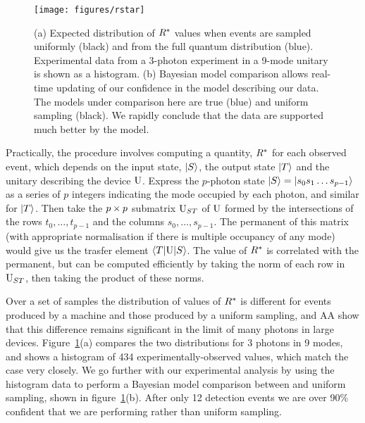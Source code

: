 \begin{figure}[t]
  \centering
  \texttt{[image: figures/rstar]}
  \caption[Using the $\rstar$ discriminator to verify BosonSampling]
  {(a) Expected distribution of \(\rstar\) values when events are sampled
  uniformly (black) and from the full quantum distribution (blue). Experimental
  data from a 3-photon experiment in a 9-mode unitary is shown as a histogram.
  (b) Bayesian model comparison allows real-time updating of our confidence in
  the model describing our data. The models under comparison here are true
  \bosonsampling{} (blue) and uniform sampling (black). We rapidly conclude that
  the data are supported much better by the \bosonsampling{} model.}
  \label{fig:rstar}
\end{figure}
Practically, the procedure involves computing a quantity, \(\rstar\) for each
observed event, which depends on the input state, \(\left|S\right\rangle\), the output state
\(\left|T\right\rangle\) and the unitary describing the device \(\mathrm{U}\). Express the
\(p\)-photon state \(\left|S\right\rangle = \left|s_{0} s_{1} \dots s_{p-1}\right\rangle\) as a series of
\(p\) integers indicating the mode occupied by each photon, and similar for
\(\left|T\right\rangle\). Then take the \(p \times p\) submatrix \(\mathrm{U}_{ST}\) of \(\mathrm{U}\)
formed by the intersections of the rows \(t_{0}, \dots, t_{p-1}\) and the
columns \(s_{0}, \dots, s_{p-1}\). The permanent of this matrix (with
appropriate normalisation if there is multiple occupancy of any mode) would give
us the trasfer element \(\left\langle T \middle| \mathrm{U} \middle| S
\right\rangle\). The value of \(\rstar\) is correlated with the permanent, but
can be computed efficiently by taking the norm of each row in
\(\mathrm{U}_{ST}\), then taking the product of these norms.

Over a set of samples the distribution of values of \(\rstar\) is different for 
events produced by a
\bosonsampling{} machine and those produced by a uniform sampling, and AA show
that this difference remains significant in the limit of many photons in large
devices. Figure~\ref{fig:rstar}(a) compares the two distributions for 3 photons
in 9 modes, and shows a histogram of 434 experimentally-observed values, which
match the \bosonsampling{} case very closely. We go further with our
experimental analysis by using the histogram data to perform a Bayesian model
comparison between \bosonsampling{} and uniform sampling, shown in
figure~\ref{fig:rstar}(b). After only 12 detection events we are over 90\%
confident that we are performing \bosonsampling{} rather than uniform sampling.

